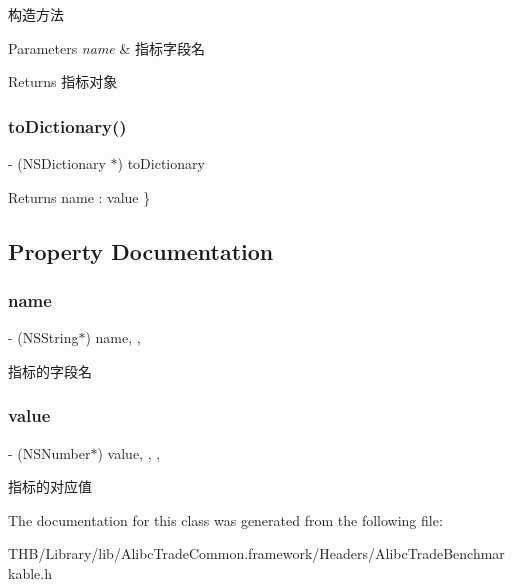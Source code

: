 构造方法


\begin{DoxyParams}{Parameters}
{\em name} & 指标字段名 \\
\hline
\end{DoxyParams}
\begin{DoxyReturn}{Returns}
指标对象 
\end{DoxyReturn}
\mbox{\label{interface_alibc_trade_measure_a4818f953321d6bcd0464878b7d50e701}} 
\subsubsection{\texorpdfstring{to\+Dictionary()}{toDictionary()}}
{\footnotesize\ttfamily -\/ (N\+S\+Dictionary $\ast$) to\+Dictionary \begin{DoxyParamCaption}{ }\end{DoxyParamCaption}}

\begin{DoxyReturn}{Returns}
name \+: value \} 
\end{DoxyReturn}


\subsection{Property Documentation}
\mbox{\label{interface_alibc_trade_measure_ac1117cd29a21f311f4cb02cb71370a3f}} 
\subsubsection{\texorpdfstring{name}{name}}
{\footnotesize\ttfamily -\/ (N\+S\+String$\ast$) name\hspace{0.3cm}{\ttfamily [read]}, {\ttfamily [nonatomic]}, {\ttfamily [strong]}}

指标的字段名 \mbox{\label{interface_alibc_trade_measure_a7c4afe61c46f3f078b1d1802c9600eca}} 
\subsubsection{\texorpdfstring{value}{value}}
{\footnotesize\ttfamily -\/ (N\+S\+Number$\ast$) value\hspace{0.3cm}{\ttfamily [read]}, {\ttfamily [write]}, {\ttfamily [nonatomic]}, {\ttfamily [strong]}}

指标的对应值 

The documentation for this class was generated from the following file\+:\begin{DoxyCompactItemize}
\item 
T\+H\+B/\+Library/lib/\+Alibc\+Trade\+Common.\+framework/\+Headers/Alibc\+Trade\+Benchmarkable.\+h\end{DoxyCompactItemize}
